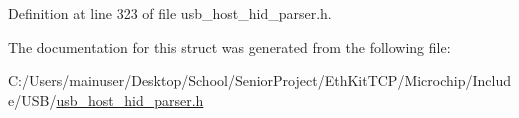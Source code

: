 Definition at line 323 of file usb\+\_\+host\+\_\+hid\+\_\+parser.\+h.



The documentation for this struct was generated from the following file\+:\begin{DoxyCompactItemize}
\item 
C\+:/\+Users/mainuser/\+Desktop/\+School/\+Senior\+Project/\+Eth\+Kit\+T\+C\+P/\+Microchip/\+Include/\+U\+S\+B/\hyperlink{usb__host__hid__parser_8h}{usb\+\_\+host\+\_\+hid\+\_\+parser.\+h}\end{DoxyCompactItemize}

